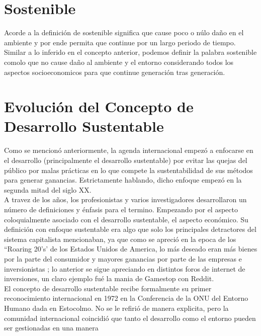 \documentclass[letterpaper, 12pt]{article}
\begin{document}
    \section*{\centering Sostenible}
    Acorde a la definición de \cite{cambridge-dictionary-2021}
    sostenible significa que cause poco o núlo daño en el ambiente y por ende permita que continue por un largo periodo de tiempo. Similar a lo inferido en el concepto anterior, podemos definir la palabra sostenible comolo que no cause daño al ambiente y el entorno considerando todos los aspectos socioeconomicos
    para que continue generación tras generación.\par

    \section*{\centering Evolución del Concepto de Desarrollo Sustentable}
    Como se mencionó anteriormente, la agenda internacional empezó a enfocarse en el desarrollo (principalmente el desarrollo sustentable) por evitar las quejas del público por malas prácticas en lo que compete
    la sustentabilidad de sus métodos para generar ganancias. Estrictamente hablando, dicho enfoque empezó en la segunda mitad del siglo XX. \cite{-2021}
    \\\newline
    \noindent A travez de los años, los profesionistas y varios investigadores desarrollaron un número de definiciones y énfasis para el termino. Empezando por el aspecto coloquialmente asociado con el desarrollo sustentable, el aspecto económico. Su definición con enfoque sustentable era
    algo que solo los principales detractores del sistema capitalista mencionaban, ya que como se apreció en la epoca de los ``Roaring 20's' de los Estados Unidos de America, lo más deseado eran más bienes por la parte del consumidor y mayores ganancias por parte de las empresas e inversionistas \citep{thulin-2021}; lo anterior se sigue apreciando en distintos
    foros de internet de inversiones, un claro ejemplo fué la mania de Gamestop con Reddit. \cite{stewart-2021} 
    \\\newline
    \noindent El concepto de desarrollo sustentable recibe formalmente su primer reconocimiento internacional en 1972 en la Conferencia de la ONU del Entorno Humano dada en Estocolmo. No se le refirió de manera explicita, pero la comunidad internacional coincidió que tanto el desarrollo como el entorno pueden ser gestionadas en una manera 
\end{document}
